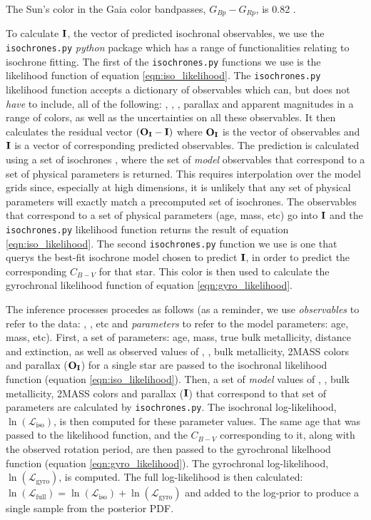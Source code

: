 The Sun's color in the Gaia color bandpasses, $G_{Bp} - G_{Rp}$, is 0.82
\citep{casagrande2018}.

To calculate ${\bf I}$, the vector of predicted isochronal observables, we use
the {\tt isochrones.py} {\it python} package which has a range of
functionalities relating to isochrone fitting.
The first of the {\tt isochrones.py} functions we use is the likelihood
function of equation \ref{eqn:iso_likelihood}.
The {\tt isochrones.py} likelihood function accepts a dictionary of
observables which can, but does not {\it have} to include, all of the
following: \teff, \logg, \feh, parallax and apparent magnitudes in a range of
colors, as well as the uncertainties on all these observables.
It then calculates the residual vector $({\bf O_I} - {\bf I})$ where ${\bf
O_I}$ is the vector of observables and ${\bf I}$ is a vector of corresponding
predicted observables.
The prediction is calculated using a set of isochrones \citep[we use the MIST
models][]{choi}, where the set of {\it model} observables that correspond to a
set of physical parameters is returned.
This requires interpolation over the model grids since, especially at high
dimensions, it is unlikely that any set of physical parameters will exactly
match a precomputed set of isochrones.
The observables that correspond to a set of physical parameters (age, mass,
etc) go into ${\bf I}$ and the {\tt isochrones.py} likelihood function returns
the result of equation \ref{eqn:iso_likelihood}.
The second {\tt isochrones.py} function we use is one that querys the best-fit
isochrone model chosen to predict ${\bf I}$, in order to predict the
corresponding $C_{B-V}$ for that star.
This color is then used to calculate the gyrochronal likelihood function of
equation \ref{eqn:gyro_likelihood}.

The inference processes procedes as follows (as a reminder, we use {\it
observables} to refer to the data: \teff, \logg, etc and {\it parameters} to
refer to the model parameters: age, mass, etc).
First, a set of parameters: age, mass, true bulk metallicity, distance and
extinction, as well as observed values of \teff, \logg, bulk metallicity,
2MASS colors and parallax (${\bf O_I}$) for a single star are passed to the
isochronal likelihood function (equation \ref{eqn:iso_likelihood}).
Then, a set of {\it model} values of \teff, \logg, bulk metallicity, 2MASS
colors and parallax (${\bf I}$) that correspond to that set of parameters are
calculated by {\tt isochrones.py}.
The isochronal log-likelihood, $\ln(\mathcal{L}_{\mathrm{iso}})$, is then
computed for these parameter values.
The same age that was passed to the likelihood function, and the $C_{B-V}$
corresponding to it, along with the observed rotation period, are then passed
to the gyrochronal likelhood function (equation \ref{eqn:gyro_likelihood}).
The gyrochronal log-likelihood, $\ln(\mathcal{L}_{\mathrm{gyro}})$, is
computed.
The full log-likelihood is then calculated: $\ln(\mathcal{L}_{\mathrm{full}})
= \ln(\mathcal{L}_{\mathrm{iso}}) + \ln(\mathcal{L}_{\mathrm{gyro}})$ and
added to the log-prior to produce a single sample from the posterior PDF.

